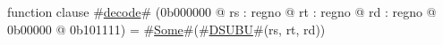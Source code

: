 function clause #\hyperref[zdecode]{decode}# (0b000000 @ rs : regno @ rt : regno @ rd : regno @ 0b00000 @ 0b101111) =
  #\hyperref[zSome]{Some}#(#\hyperref[zDSUBU]{DSUBU}#(rs, rt, rd))
